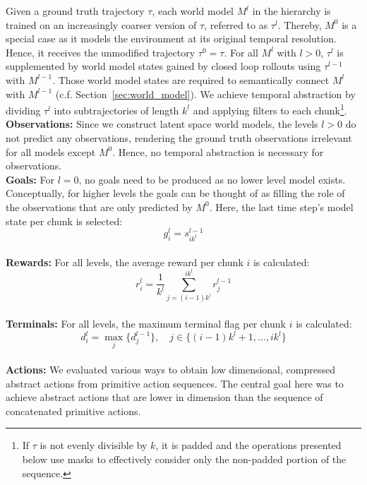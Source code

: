 \documentclass{article}
\begin{document}
Given a ground truth trajectory $\tau$, each world model $M^l$ in the hierarchy is trained on an increasingly coarser version of $\tau$, referred to as $\tau^l$. 
Thereby, $M^0$ is a special case as it models the environment at its original temporal resolution. 
Hence, it receives the unmodified trajectory $\tau^0 = \tau$. 
For all $M^l$ with $l > 0$, $\tau^l$ is supplemented by world model states gained by closed loop rollouts using $\tau^{l-1}$ with $M^{l-1}$. Those world model states are required to semantically connect $M^l$ with $M^{l-1}$ (c.f. Section~\ref{sec:world_model}). We achieve temporal abstraction by dividing $\tau^l$ into subtrajectories of length $k^l$ and applying filters to each chunk\footnote{If $\tau$ is not evenly divisible by $k$, it is padded and the operations presented below use masks to effectively consider only the non-padded portion of the sequence.}.
\\
\textbf{Observations:} 
Since we construct latent space world models, the levels $l > 0$ do not predict any observations, rendering the ground truth observations irrelevant for all models except $M^0$. Hence, no temporal abstraction is necessary for observations.
\\
\textbf{Goals:} 
For $l = 0$, no goals need to be produced as no lower level model exists. Conceptually, for higher levels the goals can be thought of as filling the role of the observations that are only predicted by $M^0$. Here, the last time step's model state per chunk is selected:
\begin{equation}
    g_i^l = s_{ik^l}^{l-1}
\end{equation}
\\
\textbf{Rewards:} For all levels, the average reward per chunk $i$ is calculated:
\begin{equation}\label{eqn:temporal_abstraction_r}
    r_i^l = \frac{1}{k^l} \sum_{j=(i-1)k^l}^{ik^l} r_j^{l-1}
\end{equation}
\\
\textbf{Terminals:} For all levels, the maximum terminal flag per chunk $i$ is calculated:
\begin{equation}
    d_i^l = \max_j \{d_j^{l-1}\}, \quad j \in \{(i-1)k^l + 1, \ldots, ik^l\}
\end{equation}
\\
\textbf{Actions:} We evaluated various ways to obtain low dimensional, compressed abstract actions from primitive action sequences. The central goal here was to achieve abstract actions that are lower in dimension than the sequence of concatenated primitive actions.
\end{document}
